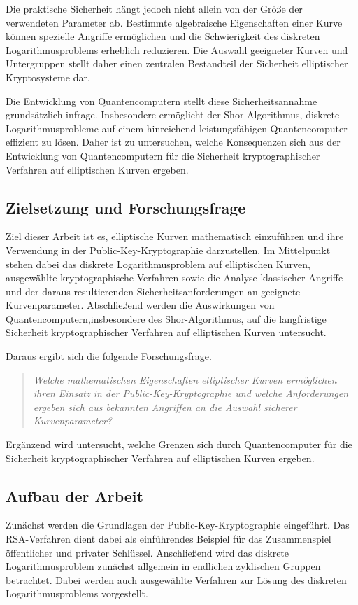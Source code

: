 Die praktische Sicherheit hängt jedoch nicht allein von der Größe der
verwendeten Parameter ab. Bestimmte algebraische Eigenschaften einer Kurve
können spezielle Angriffe ermöglichen und die Schwierigkeit des diskreten
Logarithmusproblems erheblich reduzieren. Die Auswahl geeigneter Kurven und
Untergruppen stellt daher einen zentralen Bestandteil der Sicherheit
elliptischer Kryptosysteme dar.

Die Entwicklung von Quantencomputern stellt diese Sicherheitsannahme
grundsätzlich infrage. Insbesondere ermöglicht der Shor-Algorithmus,
diskrete Logarithmusprobleme auf einem hinreichend leistungsfähigen
Quantencomputer effizient zu lösen. Daher ist zu untersuchen, welche
Konsequenzen sich aus der Entwicklung von Quantencomputern für die Sicherheit
kryptographischer Verfahren auf elliptischen Kurven ergeben.

\subsection{Zielsetzung und Forschungsfrage}

Ziel dieser Arbeit ist es, elliptische Kurven mathematisch einzuführen und
ihre Verwendung in der Public-Key-Kryptographie darzustellen. Im Mittelpunkt stehen dabei das diskrete Logarithmusproblem auf elliptischen Kurven, ausgewählte kryptographische Verfahren sowie die Analyse klassischer Angriffe und der daraus resultierenden
Sicherheitsanforderungen an geeignete Kurvenparameter. Abschließend werden die Auswirkungen von Quantencomputern,insbesondere des Shor-Algorithmus, auf die langfristige Sicherheit kryptographischer Verfahren auf elliptischen Kurven untersucht.

Daraus ergibt sich die folgende Forschungsfrage.
\begin{quote}
    \emph{Welche mathematischen Eigenschaften elliptischer Kurven
        ermöglichen ihren Einsatz in der Public-Key-Kryptographie und
        welche Anforderungen ergeben sich aus bekannten Angriffen an die
        Auswahl sicherer Kurvenparameter?}
\end{quote}
Ergänzend wird untersucht, welche Grenzen sich durch Quantencomputer für die Sicherheit kryptographischer Verfahren auf elliptischen Kurven ergeben.
\subsection{Aufbau der Arbeit}

Zunächst werden die Grundlagen der Public-Key-Kryptographie eingeführt. Das RSA-Verfahren dient dabei als einführendes Beispiel für das Zusammenspiel öffentlicher und privater Schlüssel. Anschließend wird das diskrete Logarithmusproblem zunächst allgemein in endlichen zyklischen Gruppen betrachtet. Dabei werden auch ausgewählte Verfahren zur Lösung des diskreten Logarithmusproblems vorgestellt.

